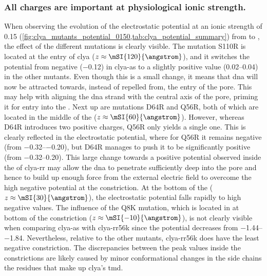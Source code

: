\subsubsection{All charges are important at physiological ionic strength.}
%
%

When observing the evolution of the electrostatic potential at an ionic strength of \SI{0.15}{\Molar}
(\cref{fig:clya_mutants_potential_0150,tab:clya_potential_summary}) from \cisi{} to \transi{}, the effect of
the different mutations is clearly visible. The mutation S110R is located at the \cisi{} entry of \gls{clya}
($z \approx \mSI{120}{\angstrom}$), and it switches the potential from negative (\SI{-0.12}{\kTe}) in
\gls{clya-as} to a slightly positive value (\SIrange{+0.02}{0.04}{\kTe}) in the other mutants. Even though
this is a small change, it means that \gls{dna} will now be attracted towards, instead of repelled from, the
\cisi{} entry of the pore. This may help with aligning the \gls{dna} strand with the central axis of the pore,
priming it for entry into the \lumen{}. Next up are mutations D64R and Q56R, both of which are located in the
middle of the \lumen{} ($z \approx \mSI{60}{\angstrom}$). However, whereas D64R introduces two positive
charges, Q56R only yields a single one. This is clearly reflected in the electrostatic potential, where for
Q56R it remains negative (from \SIrange{-0.32}{-0.20}{\kTe}), but D64R manages to push it to be significantly
positive (from \SIrange{-0.32}{+0.20}{\kTe}). This large change towards a positive potential observed inside
the \lumen{} of \gls{clya-rr} may allow the \gls{dna} to penetrate sufficiently deep into the pore and hence to
build up enough force from the external electric field to overcome the high negative potential at the
\transi{} constriction. At the bottom of the \lumen{} ($z \approx \mSI{30}{\angstrom}$), the electrostatic
potential falls rapidly to high negative values. The influence of the Q8K mutation, which is located in at
bottom of the constriction ($z \approx \mSI{-10}{\angstrom}$), is not clearly visible when comparing
\gls{clya-as} with \gls{clya-rr56k} since the potential decreases from \SIrange{-1.44}{-1.84}{\kTe}.
Nevertheless, relative to the other mutants, \gls{clya-rr56k} does have the least negative constriction. The
discrepancies between the peak values inside the constrictions are likely caused by minor conformational
changes in the side chains the residues that make up \gls{clya}'s \gls{tmd}.\footnotemark%
%
